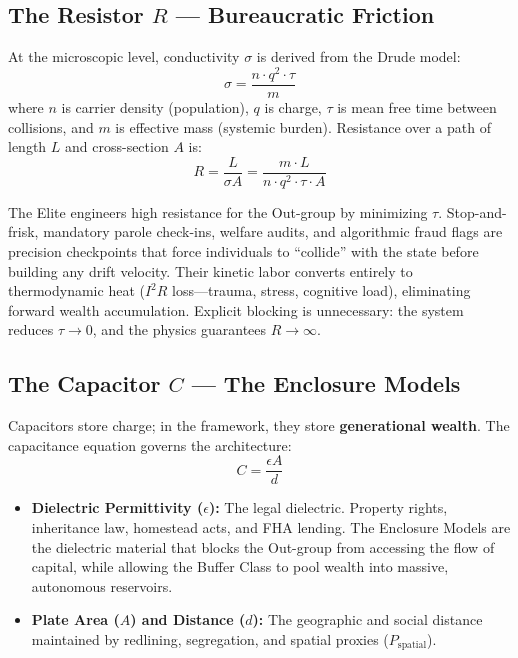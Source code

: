 \subsection{The Resistor $R$ --- Bureaucratic Friction}
\label{subsec:resistor}

At the microscopic level, conductivity $\sigma$ is derived from the Drude model:
\begin{equation}\label{eq:0.3-drude-conductivity}
\sigma = \frac{n \cdot q^2 \cdot \tau}{m}
\end{equation}
where $n$ is carrier density (population), $q$ is charge, $\tau$ is mean free
time between collisions, and $m$ is effective mass (systemic burden). Resistance
over a path of length $L$ and cross-section $A$ is:
\begin{equation}\label{eq:0.4-systemic-resistance}
R = \frac{L}{\sigma A} = \frac{m \cdot L}{n \cdot q^2 \cdot \tau \cdot A}
\end{equation}

The Elite engineers high resistance for the Out-group by minimizing $\tau$.
Stop-and-frisk, mandatory parole check-ins, welfare audits, and algorithmic
fraud flags are precision checkpoints that force individuals to ``collide'' with
the state before building any drift velocity. Their kinetic labor converts
entirely to thermodynamic heat ($I^2R$ loss---trauma, stress, cognitive load),
eliminating forward wealth accumulation. Explicit blocking is unnecessary: the system reduces $\tau \to 0$, and the physics guarantees
$R \to \infty$.

\subsection{The Capacitor $C$ --- The Enclosure Models}
\label{subsec:capacitor}

Capacitors store charge; in the framework, they store \textbf{generational
wealth}. The capacitance equation governs the architecture:
\begin{equation}\label{eq:0.5-enclosure-capacitance}
C = \frac{\epsilon A}{d}
\end{equation}

\begin{itemize}
    \item \textbf{Dielectric Permittivity ($\epsilon$):} The legal dielectric.
    Property rights, inheritance law, homestead acts, and FHA lending. The
    Enclosure Models are the dielectric material that blocks the Out-group from
    accessing the flow of capital, while allowing the Buffer Class to pool wealth
    into massive, autonomous reservoirs.
    \item \textbf{Plate Area ($A$) and Distance ($d$):} The geographic and social
    distance maintained by redlining, segregation, and spatial proxies
    ($P_{\text{spatial}}$).
\end{itemize}

